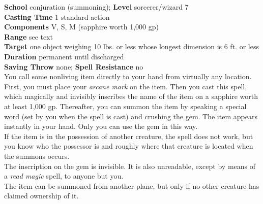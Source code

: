 \textbf{School} conjuration (summoning); \textbf{Level} sorcerer/wizard 7\\
\textbf{Casting Time} 1 standard action\\
\textbf{Components} V, S, M (sapphire worth 1,000 gp)\\
\textbf{Range} see text\\
\textbf{Target} one object weighing 10 lbs. or less whose longest dimension is 6 ft. or less\\
\textbf{Duration} permanent until discharged\\
\textbf{Saving Throw} none; \textbf{Spell Resistance} no\\
You call some nonliving item directly to your hand from virtually any location.\\
First, you must place your \textit{arcane mark} on the item. Then you cast this spell, which magically and invisibly inscribes the name of the item on a sapphire worth at least 1,000 gp. Thereafter, you can summon the item by speaking a special word (set by you when the spell is cast) and crushing the gem. The item appears instantly in your hand. Only you can use the gem in this way.\\
If the item is in the possession of another creature, the spell does not work, but you know who the possessor is and roughly where that creature is located when the summons occurs.\\
The inscription on the gem is invisible. It is also unreadable, except by means of a \textit{read magic }spell, to anyone but you.\\
The item can be summoned from another plane, but only if no other creature has claimed ownership of it.\\
